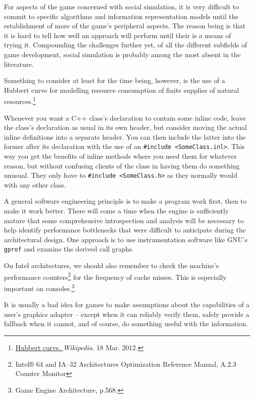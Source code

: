 For aspects of the game concerned with social simulation, it is very difficult to commit to specific algorithms and information representation models until the establishment of more of the game's peripheral aspects. The reason being is that it is hard to tell how well an approach will perform until their is a means of trying it. Compounding the challenges further yet, of all the different subfields of game development, social simulation is probably among the most absent in the literature.

Something to consider at least for the time being, however, is the use of a Hubbert curve for modelling resource consumption of finite supplies of natural resources.\footnote{\href{https://en.wikipedia.org/wiki/Hubbert_curve}{Hubbert curve. }{\it Wikipedia}. 18 Mar. 2012.}

Whenever you want a C++ class's declaration to contain some inline code, leave the class's declaration as usual in its own header, but consider moving the actual inline definitions into a separate header. You can then include the latter into the former after its declaration with the use of an {\tt \#include <SomeClass.inl>}. This way you get the benefits of inline methods where you need them for whatever reason, but without confusing clients of the class in having them do something unusual. They only have to {\tt \#include <SomeClass.h>} as they normally would with any other class.

A general software engineering principle is to make a program work first, then to make it work better. There will come a time when the engine is sufficiently mature that some comprehensive introspection and analysis will be necessary to help identify performance bottlenecks that were difficult to anticipate during the architectural design. One approach is to use instrumentation software like GNU's {\tt gprof} and examine the derived call graphs.

On Intel architectures, we should also remember to check the machine's performance counters\footnote{Intel® 64 and IA--32 Architectures Optimization Reference Manual, A.2.3 Counter Monitor} for the frequency of cache misses. This is especially important on consoles.\footnote{Game Engine Architecture, p.568.}

It is usually a bad idea for games to make assumptions about the capabilities of a user's graphics adapter -- except when it can reliably verify them, safely provide a fallback when it cannot, and of course, do something useful with the information. 

